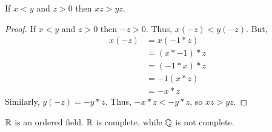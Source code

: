 \begin{theorem}
    If $x < y$ and $z > 0$ then $xz > yz$.
\end{theorem}
\begin{proof}
    If $x < y$ and $z > 0$ then $-z > 0$. Thus, $x(-z) < y(-z)$. But,
    \begin{align*}
        x(-z) &= x(-1 * z) \\
        &= (x * -1) * z \\
        &= (-1 * x) * z \\
        &= -1 (x * z) \\
        &= -x * z
    \end{align*}
    Similarly, $y(-z) = -y * z$. Thus, $-x * z < -y * z$, so $xz > yz$.
\end{proof}

\begin{remark}[Completeness of $\R$]
    $\R$ is an ordered field. $\R$ is complete, while $\mathbb{Q}$ is not complete.
\end{remark}